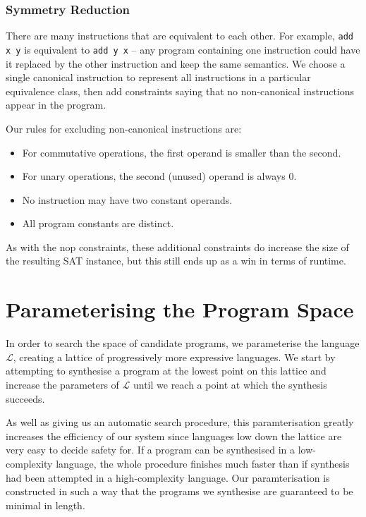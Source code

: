 \documentclass[a4paper]{llncs}
\begin{document}
\subsubsection{Symmetry Reduction}
There are many instructions that are equivalent to each other.  For example,
\verb|add x y| is equivalent to \verb|add y x| -- any program containing
one instruction could have it replaced by the other instruction and
keep the same semantics.  We choose a single canonical instruction to
represent all instructions in a particular equivalence class, then add
constraints saying that no non-canonical instructions appear in the program.

Our rules for excluding non-canonical instructions are:

\begin{itemize}
 \item For commutative operations, the first operand is smaller than the second.
 \item For unary operations, the second (unused) operand is always 0.
 \item No instruction may have two constant operands.
 \item All program constants are distinct.
\end{itemize}

As with the nop constraints, these additional constraints do increase the
size of the resulting SAT instance, but this still ends up as a win in
terms of runtime.


\section{Parameterising the Program Space}
In order to search the space of candidate programs, we parameterise
the language $\mathcal{L}$, creating a lattice of progressively
more expressive languages.  We start by attempting to synthesise
a program at the lowest point on this lattice and increase the
parameters of $\mathcal{L}$ until we reach a point at which
the synthesis succeeds.

As well as giving us an automatic search procedure, this paramterisation
greatly increases the efficiency of our system since languages
low down the lattice are very easy to decide safety for.  If a program
can be synthesised in a low-complexity language, the whole procedure
finishes much faster than if synthesis had been attempted in a
high-complexity language.  Our paramterisation is constructed
in such a way that the programs we synthesise are guaranteed to be
minimal in length.
\end{document}
